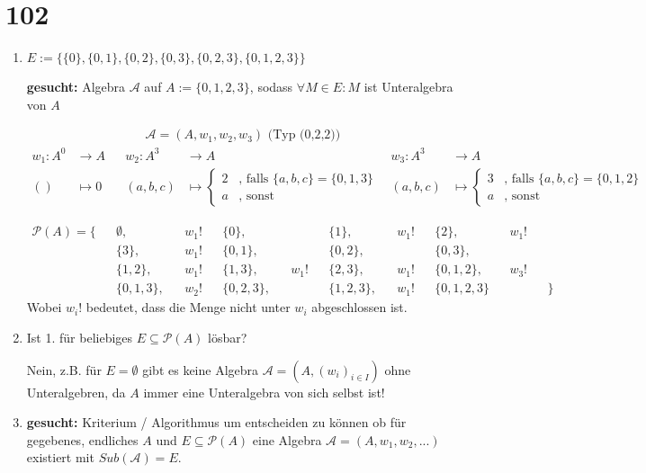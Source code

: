 \documentclass[]{article}
\begin{document}
\section{102}
\begin{enumerate}
	\item $E := \{\{0\}, \{0, 1\}, \{0, 2\}, \{0, 3\}, \{0, 2, 3\}, \{0, 1, 2, 3\}\}$
	
	\textbf{gesucht: } Algebra $\mathcal{A}$ auf $A:=\{0, 1, 2, 3\}$, sodass $\forall M \in E: M$ ist Unteralgebra von $A$
	
	\begin{align*}
		\mathcal{A} = (A, w_1, w_2, w_3) \text{ (Typ (0,2,2))}
	\end{align*}
	\begin{align*}
			w_1:A^0 &\rightarrow A && w_2:A^3 &\rightarrow A && w_3:A^3 &\rightarrow A\\
			()&\mapsto 0 && (a,b,c) &\mapsto
			\begin{cases}
				2 & \text{, falls } \{a,b,c\} = \{0,1,3\}\\
				a & \text{, sonst}
			\end{cases} &&
			(a,b,c) &\mapsto
			\begin{cases}
				3 & \text{, falls } \{a,b,c\} = \{0,1,2\}\\
				a & \text{, sonst}
			\end{cases}
	\end{align*}

	\begin{align*}
		\mathcal{P}(A) = \{&&\emptyset, &&w_1! &&\{0\}, && &&\{1\}, &&w_1! &&\{2\}, &&w_1! && \\
		                   &&\{3\}, &&w_1! &&\{0, 1\}, && &&\{0, 2\}, && &&\{0, 3\}, && && \\
		                   &&\{1, 2\}, &&w_1! &&\{1, 3\}, &&w_1! &&\{2, 3\}, &&w_1! &&\{0, 1, 2\}, &&w_3! && \\
		                   &&\{0, 1, 3\}, &&w_2! &&\{0, 2, 3\}, && &&\{1, 2, 3\}, &&w_1! &&\{0, 1, 2, 3\} && &&\}
	\end{align*}
	Wobei $w_i!$ bedeutet, dass die Menge nicht unter $w_i$ abgeschlossen ist.

	\item Ist 1. für beliebiges $E \subseteq \mathcal{P}(A)$ lösbar?
	
	Nein, z.B. für $E = \emptyset$ gibt es keine Algebra $\mathcal{A}=(A,(w_i)_{i\in I})$ ohne Unteralgebren, da $A$ immer eine Unteralgebra von sich selbst ist!

	\item \textbf{gesucht: } Kriterium / Algorithmus um entscheiden zu können ob für gegebenes, endliches $A$ und $E \subseteq \mathcal{P}(A)$ eine Algebra $\mathcal{A} = (A,w_1,w_2,...)$ existiert mit $Sub(\mathcal{A}) = E$.

\end{enumerate}
\end{document}
